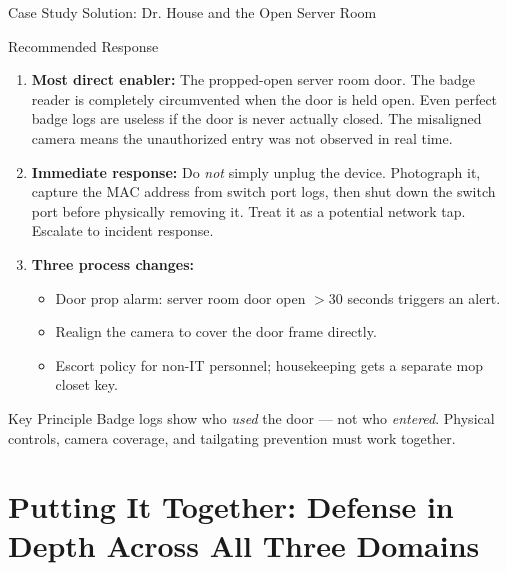 \documentclass[aspectratio=169]{beamer}  %
\begin{document}
\begin{frame}{Case Study Solution: Dr. House and the Open Server Room}
    \begin{exampleblock}{Recommended Response}
        \footnotesize
        \begin{enumerate}
            \item \textbf{Most direct enabler:} The propped-open server room door. The badge reader is completely circumvented when the door is held open. Even perfect badge logs are useless if the door is never actually closed. The misaligned camera means the unauthorized entry was not observed in real time.
            \item \textbf{Immediate response:} Do \emph{not} simply unplug the device. Photograph it, capture the MAC address from switch port logs, then shut down the switch port before physically removing it. Treat it as a potential network tap. Escalate to incident response.
            \item \textbf{Three process changes:}
                \begin{itemize}\setlength{\itemsep}{1pt}
                    \item Door prop alarm: server room door open $>$30 seconds triggers an alert.
                    \item Realign the camera to cover the door frame directly.
                    \item Escort policy for non-IT personnel; housekeeping gets a separate mop closet key.
                \end{itemize}
        \end{enumerate}
    \end{exampleblock}
    \begin{alertblock}{Key Principle}
        \footnotesize
        Badge logs show who \emph{used} the door --- not who \emph{entered}. Physical controls, camera coverage, and tailgating prevention must work together.
    \end{alertblock}
\end{frame}

\section*{Putting It Together: Defense in Depth Across All Three Domains}
\end{document}

